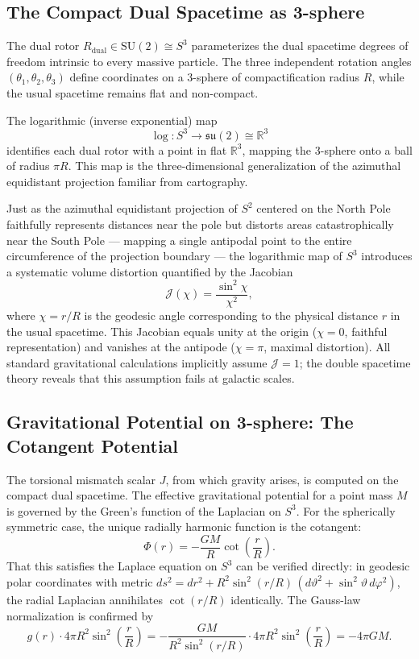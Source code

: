 \documentclass[dvipdfmx,a4paper]{article}
\begin{document}
\subsection{The Compact Dual Spacetime as 3-sphere}

The dual rotor $R_{\text{dual}} \in \mathrm{SU}(2) \cong S^3$ parameterizes the dual spacetime degrees of freedom intrinsic to every massive particle. The three independent rotation angles $(\theta_1, \theta_2, \theta_3)$ define coordinates on a 3-sphere of compactification radius $R$, while the usual spacetime remains flat and non-compact.

The logarithmic (inverse exponential) map
\[
\log : S^3 \to \mathfrak{su}(2) \cong \mathbb{R}^3
\]
identifies each dual rotor with a point in flat $\mathbb{R}^3$, mapping the 3-sphere onto a ball of radius $\pi R$. This map is the three-dimensional generalization of the azimuthal equidistant projection familiar from cartography.

Just as the azimuthal equidistant projection of $S^2$ centered on the North Pole faithfully represents distances near the pole but distorts areas catastrophically near the South Pole --- mapping a single antipodal point to the entire circumference of the projection boundary --- the logarithmic map of $S^3$ introduces a systematic volume distortion quantified by the Jacobian
\[
\mathcal{J}(\chi) = \frac{\sin^2 \chi}{\chi^2},
\]
where $\chi = r/R$ is the geodesic angle corresponding to the physical distance $r$ in the usual spacetime. This Jacobian equals unity at the origin ($\chi = 0$, faithful representation) and vanishes at the antipode ($\chi = \pi$, maximal distortion). All standard gravitational calculations implicitly assume $\mathcal{J} = 1$; the double spacetime theory reveals that this assumption fails at galactic scales.

\subsection{Gravitational Potential on 3-sphere: The Cotangent Potential}

The torsional mismatch scalar $J$, from which gravity arises, is computed on the compact dual spacetime. The effective gravitational potential for a point mass $M$ is governed by the Green's function of the Laplacian on $S^3$. For the spherically symmetric case, the unique radially harmonic function is the cotangent:
\[
\Phi(r) = -\frac{GM}{R}\cot\!\left(\frac{r}{R}\right).
\]
That this satisfies the Laplace equation on $S^3$ can be verified directly: in geodesic polar coordinates with metric $ds^2 = dr^2 + R^2 \sin^2(r/R)\,(d\vartheta^2 + \sin^2\!\vartheta\, d\varphi^2)$, the radial Laplacian annihilates $\cot(r/R)$ identically. The Gauss-law normalization is confirmed by
\[
g(r) \cdot 4\pi R^2 \sin^2\!\left(\frac{r}{R}\right) = -\frac{GM}{R^2 \sin^2(r/R)} \cdot 4\pi R^2 \sin^2\!\left(\frac{r}{R}\right) = -4\pi GM.
\]
\end{document}
